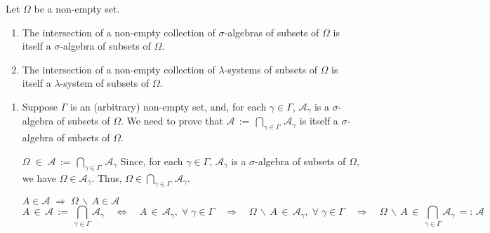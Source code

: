 \begin{theorem}\label{IntersectionSigmaAlgebras}
\quad
Let $\Omega$ be a non-empty set.
\begin{enumerate}
\item	The intersection of a non-empty collection of $\sigma$-algebras of subsets
		of $\Omega$ is itself a $\sigma$-algebra of subsets of $\Omega$.
\item	The intersection of a non-empty collection of $\lambda$-systems of subsets
		of $\Omega$ is itself a $\lambda$-system of subsets of $\Omega$.
\end{enumerate}
\end{theorem}
\proof
\begin{enumerate}
\item
	Suppose $\Gamma$ is an (arbitrary) non-empty set, and,
	for each $\gamma \in \Gamma$, $\mathcal{A}_{\gamma}$ is a $\sigma$-algebra of subsets of $\Omega$.
	We need to prove that $\mathcal{A} \, := \, \bigcap_{\gamma\in\Gamma}\,\mathcal{A}_{\gamma}$
	is itself a $\sigma$-algebra of subsets of $\Omega$.

	\vskip 0.8cm
	\noindent
	\underline{$\Omega \;\in\; \mathcal{A} \,:=\, \underset{\gamma\in\Gamma}{\bigcap}\,\mathcal{A}_{\gamma}$}
	\vskip 0.1cm
	\noindent
	Since, for each $\gamma\in\Gamma$, $\mathcal{A}_{\gamma}$ is a $\sigma$-algebra of subsets
	of $\Omega$, we have $\Omega \in \mathcal{A}_{\gamma}$.
	Thus, $\Omega \in \underset{\gamma\in\Gamma}{\bigcap}\,\mathcal{A}_{\gamma}$.

	\vskip 0.8cm
	\noindent
	\underline{$A \in \mathcal{A} \;\Longrightarrow\; \Omega\,\backslash\,A \in \mathcal{A}$}
	\begin{equation*}
	A \,\in\, \mathcal{A} \, := \, \bigcap_{\gamma\in\Gamma}\mathcal{A}_{\gamma}
	\quad\Longleftrightarrow\quad A \, \in \, \mathcal{A}_{\gamma},\;\forall\;\gamma \in \Gamma
	\quad\Longrightarrow\quad \Omega\,\backslash\,A \, \in \, \mathcal{A}_{\gamma},\;\forall\;\gamma \in \Gamma
	\quad\Longrightarrow\quad \Omega\,\backslash\,A \, \in \, \bigcap_{\gamma\in\Gamma}\mathcal{A}_{\gamma} \, =: \, \mathcal{A}
	\end{equation*}


\end{enumerate}
